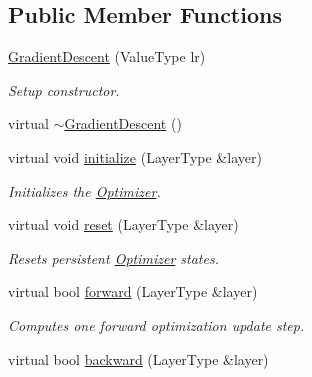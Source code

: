 \subsection*{Public Member Functions}
\begin{DoxyCompactItemize}
\item 
\hyperlink{classffnn_1_1optimizer_1_1_gradient_descent_3_01layer_1_1_fully_connected_3_01_value_type_00_01_ddfb200b81fb62a6d9db0a043eb4e0ff_a3a7056550875f01e78fc3b2ebc7bc03a}{Gradient\-Descent} (Value\-Type lr)
\begin{DoxyCompactList}\small\item\em Setup constructor. \end{DoxyCompactList}\item 
virtual \hyperlink{classffnn_1_1optimizer_1_1_gradient_descent_3_01layer_1_1_fully_connected_3_01_value_type_00_01_ddfb200b81fb62a6d9db0a043eb4e0ff_a666a345ec1a026d4d6faaa2be7b6b653}{$\sim$\-Gradient\-Descent} ()
\item 
virtual void \hyperlink{classffnn_1_1optimizer_1_1_gradient_descent_3_01layer_1_1_fully_connected_3_01_value_type_00_01_ddfb200b81fb62a6d9db0a043eb4e0ff_ac4a124d633cbf9b2ab9d407271d03729}{initialize} (Layer\-Type \&layer)
\begin{DoxyCompactList}\small\item\em Initializes the \hyperlink{classffnn_1_1optimizer_1_1_optimizer}{Optimizer}. \end{DoxyCompactList}\item 
virtual void \hyperlink{classffnn_1_1optimizer_1_1_gradient_descent_3_01layer_1_1_fully_connected_3_01_value_type_00_01_ddfb200b81fb62a6d9db0a043eb4e0ff_adc687723589de3c71f309f0278d9667c}{reset} (Layer\-Type \&layer)
\begin{DoxyCompactList}\small\item\em Resets persistent \hyperlink{classffnn_1_1optimizer_1_1_optimizer}{Optimizer} states. \end{DoxyCompactList}\item 
virtual bool \hyperlink{classffnn_1_1optimizer_1_1_gradient_descent_3_01layer_1_1_fully_connected_3_01_value_type_00_01_ddfb200b81fb62a6d9db0a043eb4e0ff_acb91cc8ee88e3877920b6ac3b83cc29f}{forward} (Layer\-Type \&layer)
\begin{DoxyCompactList}\small\item\em Computes one forward optimization update step. \end{DoxyCompactList}\item 
virtual bool \hyperlink{classffnn_1_1optimizer_1_1_gradient_descent_3_01layer_1_1_fully_connected_3_01_value_type_00_01_ddfb200b81fb62a6d9db0a043eb4e0ff_a6deaa4bad60edc72e6f75a26c8cec452}{backward} (Layer\-Type \&layer)

\end{DoxyCompactItemize}
